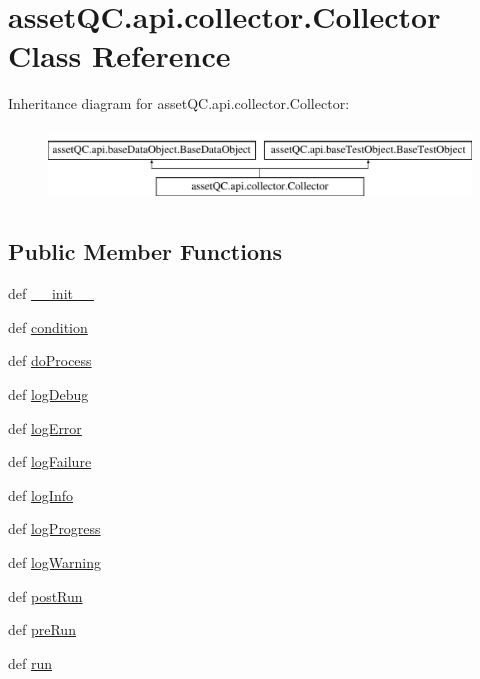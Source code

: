 \hypertarget{classassetQC_1_1api_1_1collector_1_1Collector}{\section{asset\-Q\-C.\-api.\-collector.\-Collector \-Class \-Reference}
\label{d4/d7c/classassetQC_1_1api_1_1collector_1_1Collector}
}
\-Inheritance diagram for asset\-Q\-C.\-api.\-collector.\-Collector\-:\begin{figure}[H]
\begin{center}
\leavevmode
\includegraphics[height=2.000000cm]{d4/d7c/classassetQC_1_1api_1_1collector_1_1Collector}
\end{center}
\end{figure}
\subsection*{\-Public \-Member \-Functions}
\begin{DoxyCompactItemize}
\item 
def \hyperlink{classassetQC_1_1api_1_1collector_1_1Collector_ae2f8117309be62d9c567f20d87a8589a}{\-\_\-\-\_\-init\-\_\-\-\_\-}
\item 
def \hyperlink{classassetQC_1_1api_1_1collector_1_1Collector_a7857934a428e180218a3127f8a2900a4}{condition}
\item 
def \hyperlink{classassetQC_1_1api_1_1collector_1_1Collector_a461c055b626923a76ffeac5eea2cb0d5}{do\-Process}
\item 
def \hyperlink{classassetQC_1_1api_1_1collector_1_1Collector_a2e04efb1da672a95a2efc39e2bd8ef31}{log\-Debug}
\item 
def \hyperlink{classassetQC_1_1api_1_1collector_1_1Collector_a07b8f0ac846a6f20b44b24205cfc2c65}{log\-Error}
\item 
def \hyperlink{classassetQC_1_1api_1_1collector_1_1Collector_a4a1ee07a0b6c806552af0943896b9025}{log\-Failure}
\item 
def \hyperlink{classassetQC_1_1api_1_1collector_1_1Collector_a91457e7071979bad95a1899ea1dbb3af}{log\-Info}
\item 
def \hyperlink{classassetQC_1_1api_1_1collector_1_1Collector_a26cfa1e7ace42f6afaa99a7df72acc04}{log\-Progress}
\item 
def \hyperlink{classassetQC_1_1api_1_1collector_1_1Collector_a328776cbec8a1b0d568933ea169d4bea}{log\-Warning}
\item 
def \hyperlink{classassetQC_1_1api_1_1collector_1_1Collector_a362bfa8581f8a822eaff25c21a987d06}{post\-Run}
\item 
def \hyperlink{classassetQC_1_1api_1_1collector_1_1Collector_a2dfb1d4c4b7454ed4cf12fc0b9ba15d4}{pre\-Run}
\item 
def \hyperlink{classassetQC_1_1api_1_1collector_1_1Collector_a9d6aeafbefb97fdf05d3921d01860a8b}{run}
\end{DoxyCompactItemize}
